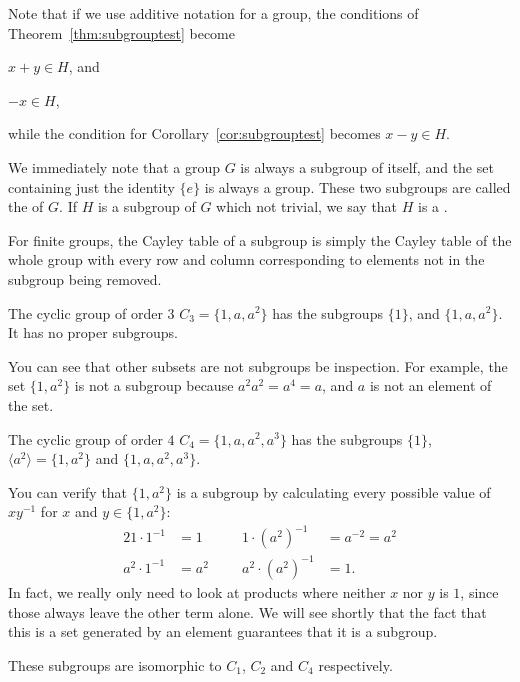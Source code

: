 Note that if we use additive notation for a group, the conditions of
Theorem~\ref{thm:subgrouptest} become
\begin{theoremenum}
  \item $x + y \in H$, and
  \item $-x \in H$,
\end{theoremenum}
while the condition for Corollary~\ref{cor:subgrouptest} becomes $x - y \in H$.

We immediately note that a group $G$ is always a subgroup of itself, and the
set containing just the identity $\{e\}$ is always a group.  These two subgroups
are called the  of $G$.  If $H$ is a
subgroup of $G$ which not trivial, we say that $H$ is a
.

For finite groups, the Cayley table of a subgroup is simply the Cayley table
of the whole group with every row and column corresponding to elements not in
the subgroup being removed.

\begin{example}
  The cyclic group of order $3$
  $C_{3} = \{1, a, a^{2}\}$ has the subgroups $\{1\}$, and $\{1, a,
  a^{2}\}$.  It has no proper subgroups.
  
  You can see that other subsets are not subgroups be inspection.
  For example, the set $\{1, a^{2}\}$ is not a subgroup because
  $a^{2}a^{2} = a^{4} = a$, and $a$ is not an element of the set.
\end{example}

\begin{example}\label{eg:C4subgroups}
  The cyclic group of order $4$ $C_{4} = \{1,
  a, a^{2}, a^{3}\}$ has the subgroups $\{1\}$, $\langle a^{2} \rangle
  = \{1, a^{2}\}$ and $\{1, a, a^{2}, a^{3}\}$.
  
  You can verify that $\{1, a^{2}\}$ is a subgroup by calculating every
  possible value of $xy^{-1}$ for $x$ and $y \in \{1, a^{2}\}$:
  \begin{alignat*}{2}
    1 \cdot 1^{-1} &= 1 \qquad & 1 \cdot (a^{2})^{-1} &= a^{-2} = a^{2}\\
    a^{2} \cdot 1^{-1} &= a^{2} & a^{2} \cdot (a^{2})^{-1} &= 1.
  \end{alignat*}
  In fact, we really only need to look at products where neither $x$ nor $y$
  is $1$, since those always leave the other term alone. We will see shortly
  that the fact that this is a set generated by an element guarantees that
  it is a subgroup.
  
  These subgroups are isomorphic to $C_{1}$, $C_{2}$ and $C_{4}$ 
  respectively.
\end{example}

